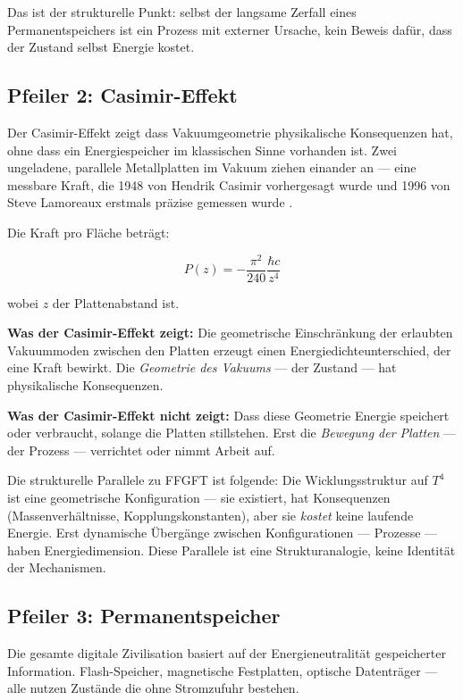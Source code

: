 Das ist der strukturelle Punkt: selbst der langsame Zerfall eines
Permanentspeichers ist ein Prozess mit externer Ursache, kein
Beweis dafür, dass der Zustand selbst Energie kostet.

\subsection{Pfeiler 2: Casimir-Effekt}

Der Casimir-Effekt zeigt dass Vakuumgeometrie physikalische Konsequenzen
hat, ohne dass ein Energiespeicher im klassischen Sinne vorhanden ist.
Zwei ungeladene, parallele Metallplatten im Vakuum ziehen einander an —
eine messbare Kraft, die 1948 von Hendrik Casimir vorhergesagt wurde
\cite{Casimir1948} und 1996 von Steve Lamoreaux erstmals präzise gemessen
wurde \cite{Lamoreaux1997}.

Die Kraft pro Fläche beträgt:

\begin{equation}
  P(z) = -\frac{\pi^2}{240}\frac{\hbar c}{z^4}
\end{equation}

wobei $z$ der Plattenabstand ist.

\textbf{Was der Casimir-Effekt zeigt:} Die geometrische Einschränkung der
erlaubten Vakuummoden zwischen den Platten erzeugt einen Energiedichteunterschied,
der eine Kraft bewirkt. Die \emph{Geometrie des Vakuums} — der Zustand — hat
physikalische Konsequenzen.

\textbf{Was der Casimir-Effekt nicht zeigt:} Dass diese Geometrie Energie
speichert oder verbraucht, solange die Platten stillstehen. Erst die
\emph{Bewegung der Platten} — der Prozess — verrichtet oder nimmt Arbeit auf.

Die strukturelle Parallele zu FFGFT ist folgende: Die Wicklungsstruktur
auf $T^4$ ist eine geometrische Konfiguration — sie existiert, hat
Konsequenzen (Massenverhältnisse, Kopplungskonstanten), aber sie
\emph{kostet} keine laufende Energie. Erst dynamische Übergänge zwischen
Konfigurationen — Prozesse — haben Energiedimension. Diese Parallele ist
eine Strukturanalogie, keine Identität der Mechanismen.

\subsection{Pfeiler 3: Permanentspeicher}

Die gesamte digitale Zivilisation basiert auf der Energieneutralität
gespeicherter Information. Flash-Speicher, magnetische Festplatten,
optische Datenträger — alle nutzen Zustände die ohne Stromzufuhr bestehen.

